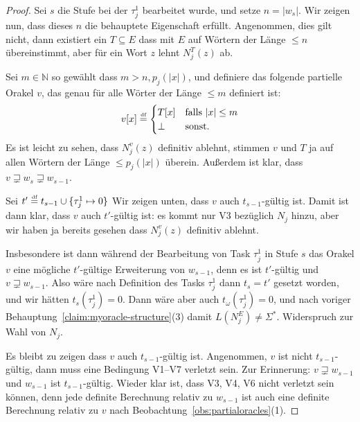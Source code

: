 \begin{proof}
    Sei $s$ die Stufe bei der $\tau^1_j$ bearbeitet wurde, 
    und setze $n=|w_{s}|$.
    Wir zeigen nun, dass dieses $n$ die behauptete Eigenschaft erfüllt.
    Angenommen, dies gilt nicht, dann existiert ein $T\subseteq E$ dass mit $E$ auf Wörtern der Länge $\leq n$ übereinstimmt, aber für ein Wort $z$ lehnt $N_j^T(z)$ ab.

    Sei $m\in\mathbb N$ so gewählt dass $m> n, p_j(|x|)$, und definiere das folgende partielle Orakel $v$, das genau für alle Wörter der Länge $\leq m$ definiert ist:
    \[ v[x] \stackrel{\text{{\normalfont\tiny df}}}{=} \begin{cases} T[x] & \text{falls $|x|\leq m$} \\ \bot & \text{sonst}. \end{cases}\]
    Es ist leicht zu sehen, dass $N_j^v(z)$ definitiv ablehnt, stimmen $v$ und $T$ ja auf allen Wörtern der Länge $\leq p_j(|x|)$ überein.
    Außerdem ist klar, dass $v\sqsupsetneq w_s \sqsupsetneq w_{s-1}$.

    Sei $t'\stackrel{\text{{\normalfont\tiny df}}}{=} t_{s-1}\cup \{\tau^1_j\mapsto 0\}$
    Wir zeigen unten, dass $v$ auch $t_{s-1}$-gültig ist. Damit ist dann klar,
    dass $v$ auch $t'$-gültig ist: es kommt nur V3 bezüglich $N_j$ hinzu, aber wir haben ja bereits gesehen dass $N_j^v(z)$ definitiv ablehnt.

    Insbesondere ist dann während der Bearbeitung von Task $\tau^1_{j}$ in Stufe $s$ das Orakel $v$ eine mögliche $t'$-gültige Erweiterung von $w_{s-1}$, denn es ist $t'$-gültig und $v\sqsupsetneq w_{s-1}$. Also wäre nach Definition des Tasks $\tau^1_{j}$ dann $t_{s}=t'$ gesetzt worden,
    und wir hätten $t_s(\tau^1_j)=0$.
    Dann wäre aber auch $t_\omega(\tau^1_j)=0$, und nach voriger Behauptung~\ref{claim:myoracle-structure}(3) damit $L(N_j^E)\neq\Sigma^*$. Widerspruch zur Wahl von $N_j$.

    Es bleibt zu zeigen dass $v$ auch $t_{s-1}$-gültig ist. Angenommen, $v$ ist nicht $t_{s-1}$-gültig, dann muss eine Bedingung V1–V7 verletzt sein. Zur Erinnerung: $v\sqsupsetneq w_{s-1}$ und $w_{s-1}$ ist $t_{s-1}$-gültig.
    Wieder klar ist, dass V3, V4, V6 nicht verletzt sein können, denn jede definite Berechnung relativ zu $w_{s-1}$ ist auch eine definite Berechnung relativ zu $v$ nach Beobachtung~\ref{obs:partialoracles}(1).


\end{proof}
